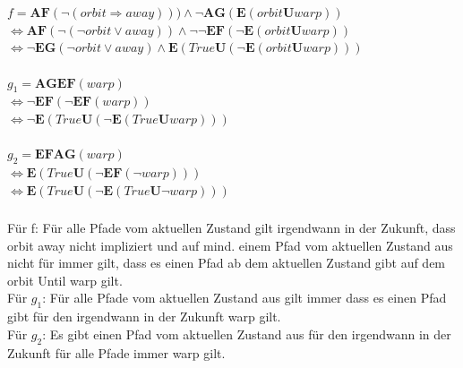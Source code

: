 \documentclass[a4paper,12pt]{scrartcl}
\title{\blatt}
\date{Gruppe 06}
\author{Sabrina Buczko 6663234, Julian Deinert 6535880, Rafael Heid 6704828}
\begin{document}
\maketitle
\newpage
\setcounter{section}{4}
\section{}
\setcounter{subsection}{2}
\subsection{}
\subsubsection{}
$f = \mathbf{AF}(\neg(orbit \Rightarrow away)))\land \neg \mathbf{AG}(\mathbf{E}(orbit\mathbf{U}warp))$\\
$\Leftrightarrow \mathbf{AF}(\neg(\neg orbit \lor away)) \land \neg\neg \mathbf{EF}(\neg\mathbf{E}(orbit\mathbf{U}warp))$\\
$\Leftrightarrow \neg\mathbf{EG}(\neg orbit \lor away) \land \mathbf{E}(True\mathbf{U}(\neg \mathbf{E}(orbit\mathbf{U}warp)))$\\\\
$g_1 = \mathbf{AGEF}(warp)$\\
$\Leftrightarrow \neg\mathbf{EF}(\neg\mathbf{EF}(warp))$\\
$\Leftrightarrow \neg\mathbf{E}(True\mathbf{U}(\neg\mathbf{E}(True\mathbf{U}warp)))$\\\\
$g_2 = \mathbf{EFAG}(warp)$\\
$\Leftrightarrow \mathbf{E}(True\mathbf{U}(\neg\mathbf{EF}(\neg warp))) $\\
$\Leftrightarrow \mathbf{E}(True\mathbf{U}(\neg\mathbf{E}(True\mathbf{U}\neg warp))) $
\subsubsection{}
Für f: Für alle Pfade vom aktuellen Zustand gilt irgendwann in der Zukunft, dass orbit away nicht impliziert und auf mind. einem Pfad vom aktuellen Zustand aus nicht für immer gilt, dass es einen Pfad ab dem aktuellen Zustand gibt auf dem orbit Until warp gilt.\\
Für $g_1$: Für alle Pfade vom aktuellen Zustand aus gilt immer dass es einen Pfad gibt für den irgendwann in der Zukunft warp gilt.\\
Für $g_2$: Es gibt einen Pfad vom aktuellen Zustand aus für den irgendwann in der Zukunft für alle Pfade immer warp gilt.
\end{document}
